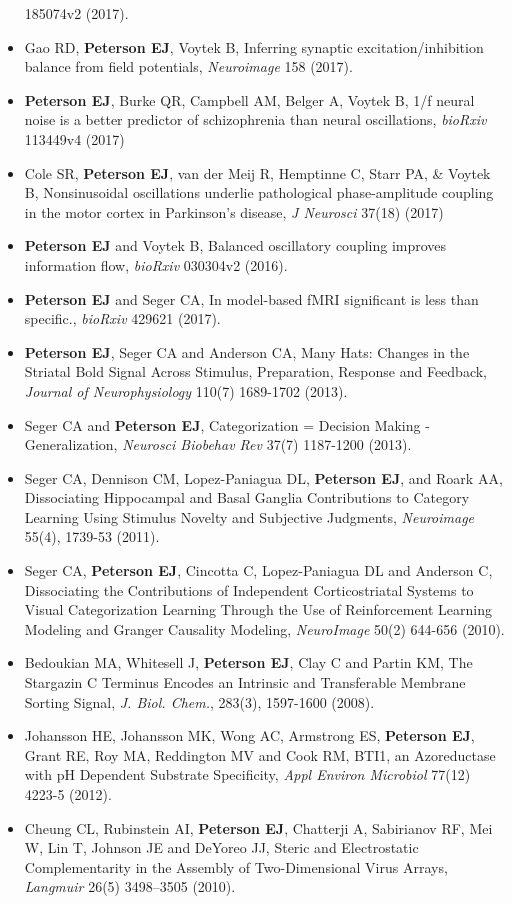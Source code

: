 \begin{itemize}
  185074v2 (2017).
\item
  Gao RD, \textbf{Peterson EJ}, Voytek B, Inferring synaptic
  excitation/inhibition balance from field potentials, \emph{Neuroimage}
  158 (2017).
\item
  \textbf{Peterson EJ}, Burke QR, Campbell AM, Belger A, Voytek B, 1/f
  neural noise is a better predictor of schizophrenia than neural
  oscillations, \emph{bioRxiv} 113449v4 (2017)
\item
  Cole SR, \textbf{Peterson EJ}, van der Meij R, Hemptinne C, Starr PA,
  \& Voytek B, Nonsinusoidal oscillations underlie pathological
  phase-amplitude coupling in the motor cortex in Parkinson's disease,
  \emph{J Neurosci} 37(18) (2017)
\item
  \textbf{Peterson EJ} and Voytek B, Balanced oscillatory coupling
  improves information flow, \emph{bioRxiv} 030304v2 (2016).
\item
  \textbf{Peterson EJ} and Seger CA, In model-based fMRI significant is
  less than specific., \emph{bioRxiv} 429621 (2017).
\item
  \textbf{Peterson EJ}, Seger CA and Anderson CA, Many Hats: Changes in
  the Striatal Bold Signal Across Stimulus, Preparation, Response and
  Feedback, \emph{Journal of Neurophysiology} 110(7) 1689-1702 (2013).
\item
  Seger CA and \textbf{Peterson EJ}, Categorization = Decision Making -
  Generalization, \emph{Neurosci Biobehav Rev} 37(7) 1187-1200 (2013).
\item
  Seger CA, Dennison CM, Lopez-Paniagua DL, \textbf{Peterson EJ}, and
  Roark AA, Dissociating Hippocampal and Basal Ganglia Contributions to
  Category Learning Using Stimulus Novelty and Subjective Judgments,
  \emph{Neuroimage} 55(4), 1739-53 (2011).
\item
  Seger CA, \textbf{Peterson EJ}, Cincotta C, Lopez-Paniagua DL and
  Anderson C, Dissociating the Contributions of Independent
  Corticostriatal Systems to Visual Categorization Learning Through the
  Use of Reinforcement Learning Modeling and Granger Causality Modeling,
  \emph{NeuroImage} 50(2) 644-656 (2010).
\item
  Bedoukian MA, Whitesell J, \textbf{Peterson EJ}, Clay C and Partin KM,
  The Stargazin C Terminus Encodes an Intrinsic and Transferable
  Membrane Sorting Signal, \emph{J. Biol. Chem.}, 283(3), 1597-1600
  (2008).
\item
  Johansson HE, Johansson MK, Wong AC, Armstrong ES, \textbf{Peterson
  EJ}, Grant RE, Roy MA, Reddington MV and Cook RM, BTI1, an
  Azoreductase with pH Dependent Substrate Specificity, \emph{Appl
  Environ Microbiol} 77(12) 4223-5 (2012).
\item
  Cheung CL, Rubinstein AI, \textbf{Peterson EJ}, Chatterji A,
  Sabirianov RF, Mei W, Lin T, Johnson JE and DeYoreo JJ, Steric and
  Electrostatic Complementarity in the Assembly of Two-Dimensional Virus
  Arrays, \emph{Langmuir} 26(5) 3498--3505 (2010).
\end{itemize}

